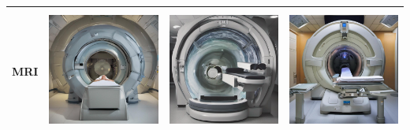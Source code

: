 \begin{table}[H]
\begin{tabularx}{\linewidth}{@{}>{\centering\arraybackslash}m{3cm}>{\centering\arraybackslash}X>{\centering\arraybackslash}X>{\centering\arraybackslash}X@{}}
MRI & \includegraphics[valign=M,width=\linewidth,height=4cm,keepaspectratio]{main/content/images/prior_concepts_sd/xl/mri/mri-0.jpg} & \includegraphics[valign=M,width=\linewidth,height=4cm,keepaspectratio]{main/content/images/prior_concepts_sd/xl/mri/mri-1.jpg} & \includegraphics[valign=M,width=\linewidth,height=4cm,keepaspectratio]{main/content/images/prior_concepts_sd/xl/mri/mri-2.jpg} \\
\midrule

\end{tabularx}
\end{table}
